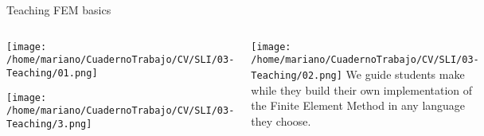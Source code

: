 \begin{frame}{Teaching FEM basics}

\begin{columns}
\begin{center}
\texttt{[image: /home/mariano/CuadernoTrabajo/CV/SLI/03-Teaching/01.png]}

\texttt{[image: /home/mariano/CuadernoTrabajo/CV/SLI/03-Teaching/3.png]}
\end{center}
\begin{center}
\texttt{[image: /home/mariano/CuadernoTrabajo/CV/SLI/03-Teaching/02.png]}
\vspace{0.5cm}
\begingroup
\small
We guide students make while they build their own 
implementation of the Finite Element Method 
in any language they choose.
\endgroup
\vspace{0.5cm}

\end{center}
\end{columns}

\end{frame}
